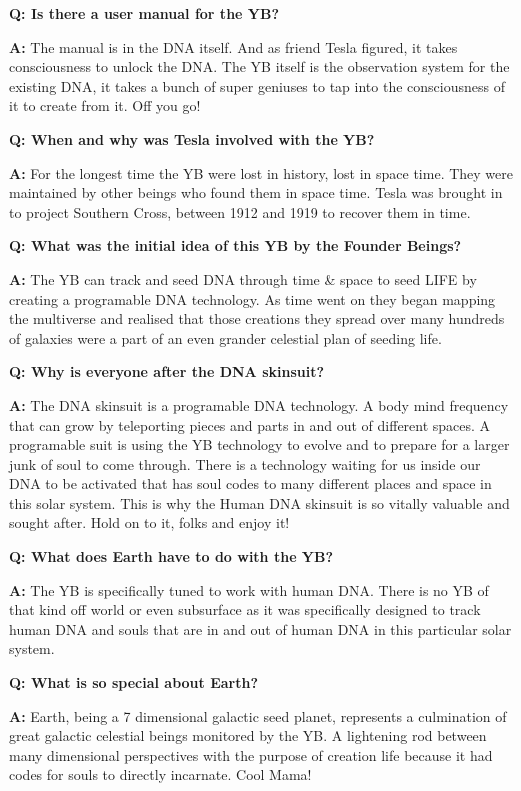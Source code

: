 \textbf{Q: Is there a user manual for the YB?}

\textbf{A:} The manual is in the DNA itself. And as friend Tesla
figured, it takes consciousness to unlock the DNA. The YB itself is the
observation system for the existing DNA, it takes a bunch of super
geniuses to tap into the consciousness of it to create from it. Off you
go!

\textbf{Q: When and why was Tesla involved with the YB?}

\textbf{A:} For the longest time the YB were lost in history, lost in
space time. They were maintained by other beings who found them in space
time. Tesla was brought in to project Southern Cross, between 1912 and
1919 to recover them in time.

\textbf{Q: What was the initial idea of this YB by the Founder Beings?}

\textbf{A:} The YB can track and seed DNA through time \& space to seed
LIFE by creating a programable DNA technology. As time went on they
began mapping the multiverse and realised that those creations they
spread over many hundreds of galaxies were a part of an even grander
celestial plan of seeding life.

\textbf{Q: Why is everyone after the DNA skinsuit?}

\textbf{A:} The DNA skinsuit is a programable DNA technology. A body
mind frequency that can grow by teleporting pieces and parts in and out
of different spaces. A programable suit is using the YB technology to
evolve and to prepare for a larger junk of soul to come through. There
is a technology waiting for us inside our DNA to be activated that has
soul codes to many different places and space in this solar system. This
is why the Human DNA skinsuit is so vitally valuable and sought after.
Hold on to it, folks and enjoy it!

\textbf{Q: What does Earth have to do with the YB?}

\textbf{A:} The YB is specifically tuned to work with human DNA. There
is no YB of that kind off world or even subsurface as it was
specifically designed to track human DNA and souls that are in and out
of human DNA in this particular solar system.

\textbf{Q: What is so special about Earth?}

\textbf{A:} Earth, being a 7 dimensional galactic seed planet,
represents a culmination of great galactic celestial beings monitored by
the YB. A lightening rod between many dimensional perspectives with the
purpose of creation life because it had codes for souls to directly
incarnate. Cool Mama!

